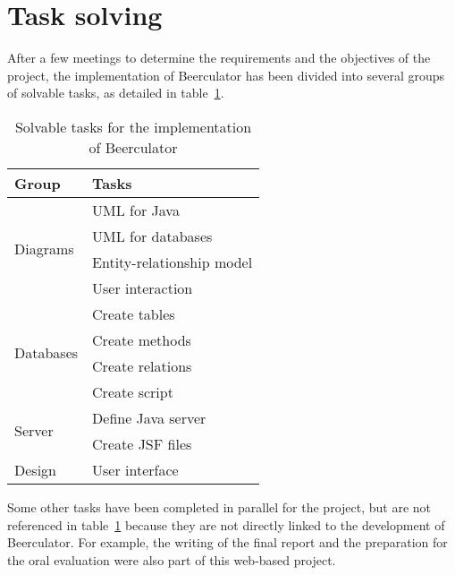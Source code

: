 \section{Task solving}
\label{sec:task}

After a few meetings to determine the requirements and the objectives of the project, the implementation of Beerculator has been divided into several groups of solvable tasks, as detailed in {\sc table}~\ref{table:tasks}.

\begin{table}[H]
\centering
\begin{tabular}{|l|l|}
  \hline
  \textbf{Group} & \textbf{Tasks}\\ \hline
  \multirow{4}{*}{Diagrams} & UML for Java \\
    & UML for databases \\
    & Entity-relationship model \\
    & User interaction \\ \hline
  \multirow{4}{*}{Databases} & Create tables \\
    & Create methods \\
    & Create relations \\ 
    & Create script \\ \hline
  \multirow{2}{*}{Server} & Define Java server \\
    & Create JSF files \\
 \hline
    Design & User interface\\
    \hline
\end{tabular}
\caption{Solvable tasks for the implementation of Beerculator}
\label{table:tasks}
\end{table}


Some other tasks have been completed in parallel for the project, but are not referenced in {\sc table}~\ref{table:tasks} because they are not directly linked to the development of Beerculator. For example, the writing of the final report and the preparation for the oral evaluation were also part of this web-based project.
